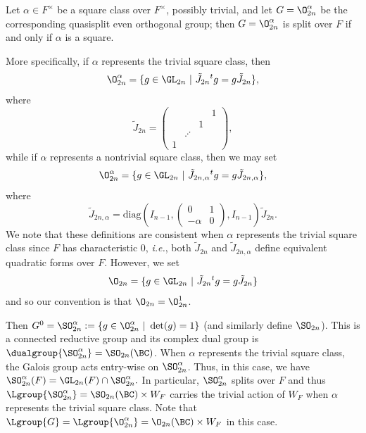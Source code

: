 \documentclass[11pt,letterpaper]{amsart}
\numberwithin{equation}{section}
\begin{document}
Let $\alpha \in F^\times$ be a square class over $F^\times$, possibly trivial, and let $G = \O_{2n}^\alpha$ be the corresponding quasisplit even orthogonal group; then $G= \O_{2n}^\alpha$ is split over $F$ if and only if $\alpha$ is a square.
{More specifically, if $\alpha$ represents the trivial square class, then 
\[
\O_{2n}^\alpha=\{g\in\GL_{2n} \ | \ \tilde{J}_{2n}{}^tg=g\tilde{J}_{2n}\},
\]
where
\[
\tilde{J}_{2n}= \begin{pmatrix}
&&&1 \\
&&1& \\
&\iddots&&\\
1&&&
\end{pmatrix},
\]
while if $\alpha$ represents a nontrivial square class, then we may set
\[
\O_{2n}^\alpha=\{g\in\GL_{2n} \ | \ \tilde{J}_{2n,\alpha}{}^tg=g\tilde{J}_{2n,\alpha}\},
\]
where 
\[
\tilde{J}_{2n,\alpha}=\mathrm{diag}(I_{n-1},\begin{pmatrix}
    0 & 1 \\
    -\alpha & 0
\end{pmatrix}, I_{n-1}) \tilde{J}_{2n}.
\]
We note that these definitions are consistent when $\alpha$ represents the trivial square class since $F$ has characteristic 0, {\it i.e.}, both $\tilde{J}_{2n}$ and $\tilde{J}_{2n,\alpha}$ define equivalent quadratic forms over $F$. However, we set 
\[
\O_{2n}=\{g\in\GL_{2n} \ | \ \tilde{J}_{2n}{}^tg=g\tilde{J}_{2n}\}
\]
and so our convention is that $\O_{2n}=\O_{2n}^1$. 

Then $G^0 = \SO_{2n}^\alpha:=\{g\in\O_{2n}^\alpha \ | \ \det(g)=1\}$ (and similarly define $\SO_{2n}$). This is a connected reductive group and its complex dual group is $\dualgroup{\SO_{2n}^\alpha} = \SO_{2n}(\BC)$. When $\alpha$ represents the trivial square class, the Galois group acts entry-wise on $\SO_{2n}^\alpha$. Thus, in this case, we have $\SO_{2n}^\alpha(F)=\GL_{2n}(F) \cap \SO_{2n}^\alpha.$ In particular, $\SO_{2n}^\alpha$ splits over $F$ and thus $\Lgroup{\SO_{2n}^\alpha}=\SO_{2n}(\BC)\times W_F$ carries the trivial action of $W_F$ when $\alpha$ represents the trivial square class. Note that $\Lgroup{G} = \Lgroup{\O^\alpha_{2n}}=\O_{2n}(\BC)\times W_F$ in this case. 

}
\end{document}
